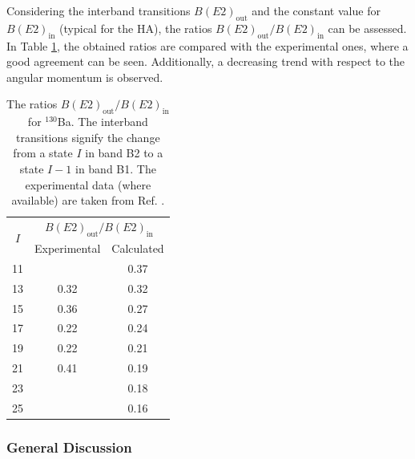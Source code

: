 Considering the interband transitions $B(E2)_\text{out}$ and the constant value for $B(E2)_\text{in}$ (typical for the HA), the ratios $B(E2)_\text{out}/B(E2)_\text{in}$ can be assessed. In Table \ref{BE2-out-in-ratio-130Ba}, the obtained ratios are compared with the experimental ones, where a good agreement can be seen. Additionally, a decreasing trend with respect to the angular momentum is observed.
\begin{table}
    \centering
    \begin{tabular}{|c|cc|}
    \hline
    \multirow{2}{*}{$I$} & \multicolumn{2}{c|}{$B(E2)_\text{out}/B(E2)_\text{in}$} \\ \cline{2-3} 
                         & \multicolumn{1}{c|}{Experimental}          & Calculated         \\ \hline
    11                   & \multicolumn{1}{c|}{}                      & 0.37           \\ \hline
    13                   & \multicolumn{1}{c|}{0.32}                  & 0.32           \\ \hline
    15                   & \multicolumn{1}{c|}{0.36}                  & 0.27           \\ \hline
    17                   & \multicolumn{1}{c|}{0.22}                  & 0.24           \\ \hline
    19                   & \multicolumn{1}{c|}{0.22}                  & 0.21           \\ \hline
    21                   & \multicolumn{1}{c|}{0.41}                  & 0.19           \\ \hline
    23                   & \multicolumn{1}{c|}{}                      & 0.18           \\ \hline
    25                   & \multicolumn{1}{c|}{}                      & 0.16           \\ \hline
    \end{tabular}%
    \caption{The ratios $B(E2)_\text{out}/B(E2)_\text{in}$ for $^{130}$Ba. The interband transitions signify the change from a state $I$ in band B2 to a state $I-1$ in band B1. The experimental data (where available) are taken from Ref. \cite{petrache2019diversity,chen2019transverse}.}
    \label{BE2-out-in-ratio-130Ba}
\end{table}

\subsubsection{General Discussion}

